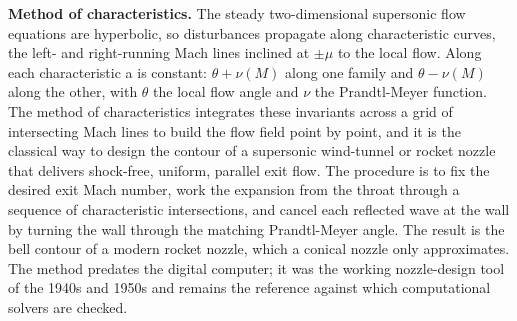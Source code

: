 \begin{mastery}
\textbf{Method of characteristics.} The steady two-dimensional
supersonic flow equations are hyperbolic, so disturbances propagate
along characteristic curves, the left- and right-running Mach lines
inclined at $\pm\mu$ to the local flow. Along each characteristic a
 is constant: $\theta + \nu(M)$ along one
family and $\theta - \nu(M)$ along the other, with $\theta$ the local
flow angle and $\nu$ the Prandtl-Meyer function. The method of
characteristics integrates these invariants across a grid of
intersecting Mach lines to build the flow field point by point, and it
is the classical way to design the contour of a supersonic
wind-tunnel or rocket nozzle that delivers shock-free, uniform,
parallel exit flow. The procedure is to fix the desired exit Mach
number, work the expansion from the throat through a sequence of
characteristic intersections, and cancel each reflected wave at the
wall by turning the wall through the matching Prandtl-Meyer angle. The
result is the bell contour of a modern rocket nozzle, which a conical
nozzle only approximates. The method predates the digital computer; it
was the working nozzle-design tool of the 1940s and 1950s and remains
the reference against which computational solvers are checked.
\end{mastery}

